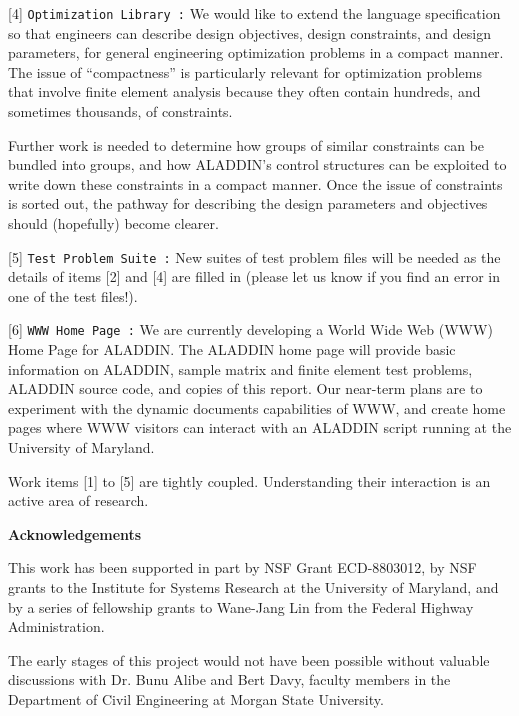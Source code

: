 \begin{description}
\item{[4]}
{\tt Optimization Library :}
We would like to extend the language specification so that engineers
can describe design objectives, design constraints, and design parameters,
for general engineering optimization problems in a compact manner.
The issue of ``compactness'' is particularly relevant for optimization
problems that involve finite element analysis because they often
contain hundreds, and sometimes thousands, of constraints.

Further work is needed to determine how groups of similar constraints
can be bundled into groups, and how ALADDIN's control structures
can be exploited to write down these constraints in a compact manner.
Once the issue of constraints is sorted out, the pathway for
describing the design parameters and objectives should (hopefully) become clearer.

\item{[5]}
{\tt Test Problem Suite :} New suites of test problem files will be
needed as the details of items [2] and [4] are filled in (please
let us know if you find an error in one of the test files!).

\item{[6]}
{\tt WWW Home Page :} We are currently developing a
World Wide Web (WWW) Home Page for ALADDIN. The ALADDIN home page
will provide basic information on ALADDIN,
sample matrix and finite element test problems,
ALADDIN source code, and copies of this report.
Our near-term plans are to experiment with the dynamic documents
capabilities of WWW, and create home pages where WWW visitors
can interact with an ALADDIN script running at the University of Maryland.

\end{description}

\vspace{0.15 in}\noindent
Work items [1] to [5] are tightly coupled.
Understanding their interaction is an active area of research.

\vspace{0.25 in}\noindent
{\bf Acknowledgements}

\vspace{0.15 in}
\noindent\hspace{0.50 in}
This work has been supported in part by NSF Grant ECD-8803012,
by NSF grants to the Institute for Systems Research at the University of Maryland,
and by a series of fellowship grants to Wane-Jang Lin from the Federal Highway Administration.

\vspace{0.15 in}
\noindent\hspace{0.50 in}
The early stages of this project would not have been possible without
valuable discussions with Dr. Bunu Alibe and Bert Davy,
faculty members in the Department of Civil Engineering at Morgan State University. 
